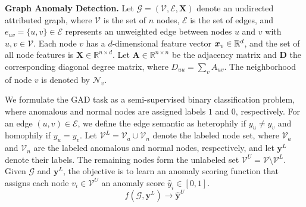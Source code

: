 \noindent \textbf{Graph Anomaly Detection.}
Let $\mathcal{G}=(\mathcal{V},\mathcal{E},\boldsymbol{X})$ denote an 
undirected attributed graph, where $\mathcal{V}$ is the set of $n$ nodes, 
$\mathcal{E}$ is the set of edges, and  $e_{uv}=\{{u, v}\} \in  \mathcal{E}$ represents an unweighted edge between nodes $u$ and $v$ with $u, v \in \mathcal{V}$. 
Each node $v$ has a $d$-dimensional feature vector $\bm{x}_v\in\mathbb{R}^d$, and the set of all node features is $\boldsymbol{X}\in\mathbb{R}^{n\times d}$.
Let $\boldsymbol{A}\in\mathbb{R}^{n\times n}$ be the adjacency matrix and
$\boldsymbol{D}$ the corresponding diagonal degree matrix, where
$D_{uu}=\sum_v A_{uv}$. The neighborhood of node $v$ is denoted by
$\mathcal{N}_{v}$.

We formulate the GAD task as a semi-supervised binary
classification problem, where anomalous and normal nodes are assigned
labels $1$ and $0$, respectively.
For an edge $(u, v) \in \mathcal{E}$, we define the edge semantic as heterophily if $y_u \neq y_v$ and homophily if $y_u = y_v$.
Let $\mathcal{V}^{L}=\mathcal{V}_{a}\cup\mathcal{V}_{n}$ denote the labeled
node set, where $\mathcal{V}_{a}$ and $\mathcal{V}_{n}$ are the labeled
anomalous and normal nodes, respectively, and let
$\boldsymbol{y}^{L}$ denote their labels. The remaining nodes form the
unlabeled set $\mathcal{V}^{U}=\mathcal{V}\setminus\mathcal{V}^{L}$.
Given $\mathcal{G}$ and $\boldsymbol{y}^{L}$, the objective is to learn
an anomaly scoring function that assigns each node
$v_i\in\mathcal{V}^{U}$ an anomaly score $\hat{y}_i\in[0,1]$.
\begin{equation}
    f(\mathcal{G}, \boldsymbol{y}^{L}) \rightarrow \hat{\boldsymbol{y}}^{U}
\end{equation}

